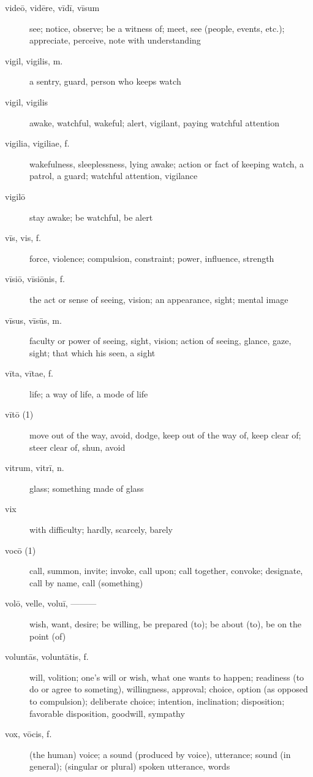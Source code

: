 \begin{description}
    \item[videō, vidēre, vīdī, vīsum] \marginnote{*}see; notice, observe; be a witness of; meet, see (people, events, etc.); appreciate, perceive, note with understanding
    \item[vigil, vigilis, m.] a sentry, guard, person who keeps watch
    \item[vigil, vigilis] awake, watchful, wakeful; alert, vigilant, paying watchful attention
    \item[vigilia, vigiliae, f.] wakefulness, sleeplessness, lying awake; action or fact of keeping watch, a patrol, a guard; watchful attention, vigilance
    \item[vigilō] stay awake; be watchful, be alert
    \item[vīs, vis, f.] \marginnote{*}force, violence; compulsion, constraint; power, influence, strength
    \item[vīsiō, vīsiōnis, f.] the act or sense of seeing, vision; an appearance, sight; mental image
    \item[vīsus, vīsūs, m.] faculty or power of seeing, sight, vision; action of seeing, glance, gaze, sight; that which his seen, a sight
    \item[vīta, vītae, f.] \marginnote{*}life; a way of life, a mode of life
    \item[vītō (1)] \marginnote{*}move out of the way, avoid, dodge, keep out of the way of, keep clear of; steer clear of, shun, avoid
    \item[vitrum, vitrī, n.] glass; something made of glass
    \item[vix] \marginnote{*}with difficulty; hardly, scarcely, barely
    \item[vocō (1)] \marginnote{*}call, summon, invite; invoke, call upon; call together, convoke; designate, call by name, call (something)
    \item[volō, velle, voluī, ———] \marginnote{*}wish, want, desire; be willing, be prepared (to); be about (to), be on the point (of)
    \item[voluntās, voluntātis, f.] \marginnote{*}will, volition; one's will or wish, what one wants to happen; readiness (to do or agree to someting), willingness, approval; choice, option (as opposed to compulsion); deliberate choice; intention, inclination; disposition; favorable disposition, goodwill, sympathy
    \item[vox, vōcis, f.] \marginnote{*}(the human) voice; a sound (produced by voice), utterance; sound (in general); (singular or plural) spoken utterance, words

\end{description}
